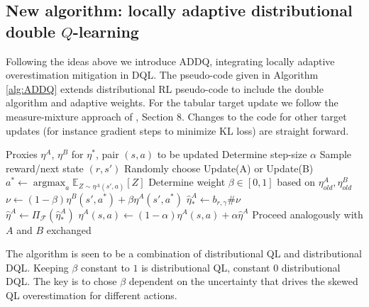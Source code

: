 \documentclass{article}
\theoremstyle{plain}
\theoremstyle{definition}
\theoremstyle{remark}
\begin{document}
\subsection{New algorithm: locally adaptive distributional double $Q$-learning}\label{sec:tabular}
Following the ideas above we introduce ADDQ, integrating locally adaptive overestimation mitigation in DQL. The pseudo-code given in Algorithm \ref{alg:ADDQ} extends distributional RL pseudo-code to include the double algorithm and adaptive weights. For the tabular target update we follow the measure-mixture approach of \cite{rowland18}, Section 8. Changes to the code for other target updates (for instance gradient steps to minimize KL loss) are straight forward.
\begin{algorithm}[h]
\caption{ADDQ update step}
\label{alg:ADDQ}
\begin{algorithmic}
\REQUIRE Proxies $\eta^A$, $\eta^B$ for $\eta^*$, pair $(s,a)$ to be updated
\STATE Determine step-size $\alpha$
\STATE Sample reward/next state $(r, s')$
\STATE Randomly choose Update(A) or Update(B)
\STATE $a^* \gets \operatorname{argmax}_a \mathbb{E}_{Z \sim \eta^A(s',a)} [Z]$
\STATE Determine weight $\beta\in[0,1]$ based on $\eta^A_{old}, \eta^B_{old}$
\STATE $\nu\gets (1-\beta)\eta^B(s',a^*)+\beta\eta^A(s',a^*)$
\STATE $\hat{\eta}_*^A \gets b_{r, \gamma} \#\nu$\\
\STATE $\hat{\eta}^A \gets \Pi_\mathcal F (\hat{\eta}_*^A)$
\STATE $\eta^A(s,a) \leftarrow (1 - \alpha)\eta^A(s,a) + \alpha\hat{\eta}^A$
 \ENDIF
{}
\STATE Proceed analogously with $A$ and $B$ exchanged\\
\ENDIF
\end{algorithmic}
\end{algorithm}
The algorithm is seen to be a combination of distributional QL and distributional DQL. Keeping $\beta$ constant to $1$ is distributional QL, constant $0$ distributional DQL. The key is to chose $\beta$ dependent on the uncertainty that drives the skewed QL overestimation for different actions. 
\end{document}
